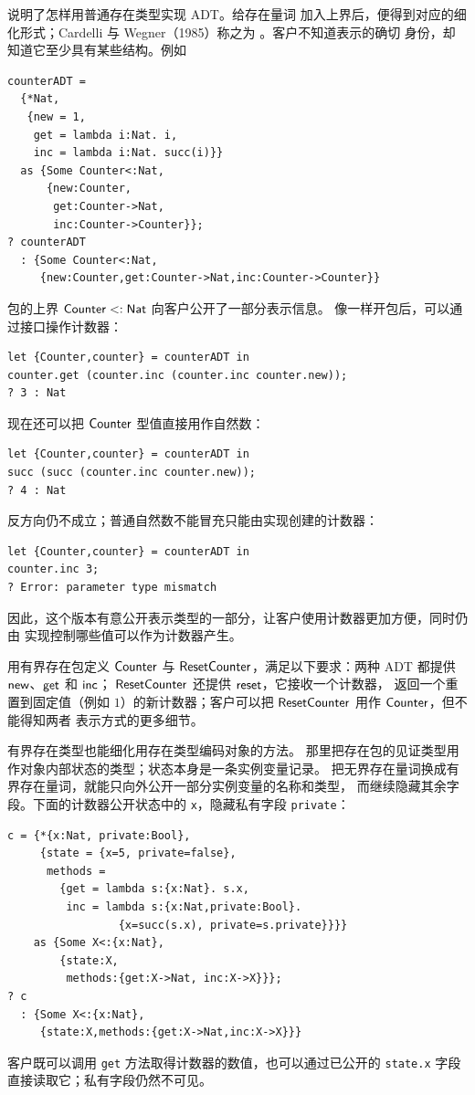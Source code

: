 说明了怎样用普通存在类型实现 ADT。给存在量词
加入上界后，便得到对应的细化形式；Cardelli 与 Wegner（1985）称之为
。客户不知道表示的确切
身份，却知道它至少具有某些结构。例如
\begin{lstlisting}
counterADT =
  {*Nat,
   {new = 1,
    get = lambda i:Nat. i,
    inc = lambda i:Nat. succ(i)}}
  as {Some Counter<:Nat,
      {new:Counter,
       get:Counter->Nat,
       inc:Counter->Counter}};
? counterADT
  : {Some Counter<:Nat,
     {new:Counter,get:Counter->Nat,inc:Counter->Counter}}
\end{lstlisting}
包的上界 \(\mathsf{Counter}<:\mathsf{Nat}\) 向客户公开了一部分表示信息。
像一样开包后，可以通过接口操作计数器：
\begin{lstlisting}
let {Counter,counter} = counterADT in
counter.get (counter.inc (counter.inc counter.new));
? 3 : Nat
\end{lstlisting}
现在还可以把 \(\mathsf{Counter}\) 型值直接用作自然数：
\begin{lstlisting}
let {Counter,counter} = counterADT in
succ (succ (counter.inc counter.new));
? 4 : Nat
\end{lstlisting}
反方向仍不成立；普通自然数不能冒充只能由实现创建的计数器：
\begin{lstlisting}
let {Counter,counter} = counterADT in
counter.inc 3;
? Error: parameter type mismatch
\end{lstlisting}
因此，这个版本有意公开表示类型的一部分，让客户使用计数器更加方便，同时仍由
实现控制哪些值可以作为计数器产生。

\begin{exercise}[\(\star\star\star\)]
\label{ex:26.5.3}
用有界存在包定义 \(\mathsf{Counter}\) 与
\(\mathsf{ResetCounter}\)，满足以下要求：两种 ADT 都提供
\(\mathsf{new}\)、\(\mathsf{get}\) 和 \(\mathsf{inc}\)；
\(\mathsf{ResetCounter}\) 还提供 \(\mathsf{reset}\)，它接收一个计数器，
返回一个重置到固定值（例如 \(1\)）的新计数器；客户可以把
\(\mathsf{ResetCounter}\) 用作 \(\mathsf{Counter}\)，但不能得知两者
表示方式的更多细节。
\end{exercise}

有界存在类型也能细化用存在类型编码对象的方法。
那里把存在包的见证类型用作对象内部状态的类型；状态本身是一条实例变量记录。
把无界存在量词换成有界存在量词，就能只向外公开一部分实例变量的名称和类型，
而继续隐藏其余字段。下面的计数器公开状态中的 \texttt{x}，隐藏私有字段
\texttt{private}：
\begin{lstlisting}
c = {*{x:Nat, private:Bool},
     {state = {x=5, private=false},
      methods =
        {get = lambda s:{x:Nat}. s.x,
         inc = lambda s:{x:Nat,private:Bool}.
                 {x=succ(s.x), private=s.private}}}}
    as {Some X<:{x:Nat},
        {state:X,
         methods:{get:X->Nat, inc:X->X}}};
? c
  : {Some X<:{x:Nat},
     {state:X,methods:{get:X->Nat,inc:X->X}}}
\end{lstlisting}
客户既可以调用 \texttt{get} 方法取得计数器的数值，也可以通过已公开的
\texttt{state.x} 字段直接读取它；私有字段仍然不可见。

